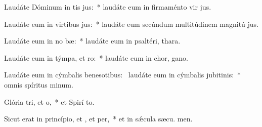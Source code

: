 \item Laudáte Dóminum in tis jus:~* laudáte eum in firmaménto vir jus.
\item Laudáte eum in virtibus jus:~* laudáte eum secúndum multitúdinem magnitú jus.
\item Laudáte eum in no bæ:~* laudáte eum in psaltéri,  thara.
\item Laudáte eum in týmpa, et ro:~* laudáte eum in chor,  gano.
\item Laudáte eum in cýmbalis benesotibus:~\pscross{} laudáte eum in cýmbalis jubitinis:~* omnis spíritus  minum.
\item Glória tri, et o,~* et Spirí to.
\item Sicut erat in princípio, et , et per,~* et in sǽcula sæcu. men.

